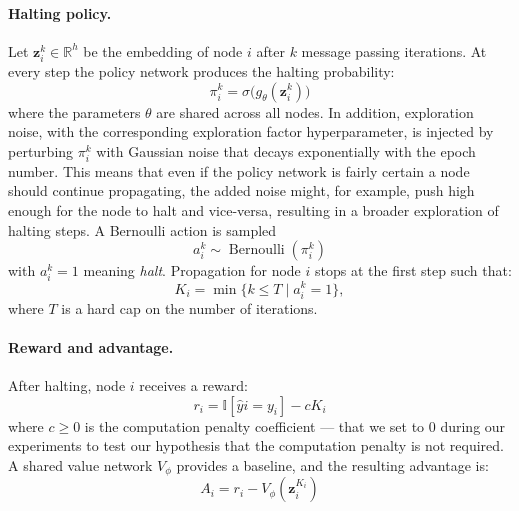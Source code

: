 \documentclass{gdl}
\begin{document}
\paragraph{Halting policy.}
Let $\mathbf{z}_i^{k}\in\mathbb{R}^h$ be the embedding of node $i$ after $k$ message passing iterations. At every step the policy network produces the halting probability:
\begin{equation}
\pi_i^{k}=\sigma\bigl(g_{\theta}(\mathbf{z}_i^{k})\bigr)
\end{equation}
where the parameters $\theta$ are shared across all nodes. In addition, exploration noise, with the corresponding exploration factor hyperparameter, is injected by perturbing $\pi_i^{k}$ with Gaussian noise that decays exponentially with the epoch number. This means that even if the policy network is fairly certain a node should continue propagating, the added noise might, for example, push high enough for the node to halt and vice-versa, resulting in a broader exploration of halting steps. A Bernoulli action is sampled
\begin{equation}
a_i^{k} \sim \operatorname{Bernoulli}(\pi_i^{k})
\end{equation}
with $a_i^{k}=1$ meaning \emph{halt}. Propagation for node $i$ stops at the first step such that:
\begin{equation}
K_i = \min\{ k \le T \mid a_i^k = 1 \},
\end{equation}
where $T$ is a hard cap on the number of iterations.

\paragraph{Reward and advantage.}
After halting, node $i$ receives a reward:
\begin{equation}
r_i = \mathbb{I}[\hat{y}i = y_i] - cK_i
\end{equation}
where $c\ge 0$ is the computation penalty coefficient --- that we set to 0 during our experiments to test our hypothesis that the computation penalty is not required. A shared value network $V_{\phi}$ provides a baseline, and the resulting advantage is:
\begin{equation}
A_i = r_i - V_{\phi}(\mathbf{z}_i^{K_i})
\end{equation}
\end{document}
